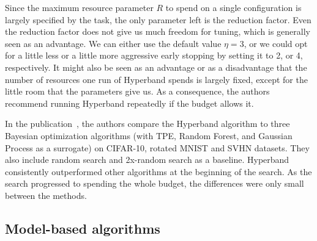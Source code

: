 Since the maximum resource parameter $R$ to spend on a single configuration is largely specified by the task, the only parameter left is the reduction factor. Even the reduction factor does not give us much freedom for tuning, which is generally seen as an advantage. We can either use the default value $\eta=3$, or we could opt for a little less or a little more aggressive early stopping by setting it to 2, or 4, respectively. It might also be seen as an advantage or as a disadvantage that the number of resources one run of Hyperband spends is largely fixed, except for the little room that the parameters give us. As a consequence, the authors recommend running Hyperband repeatedly if the budget allows it.

In the publication~\cite{li2018hyperband}, the authors compare the Hyperband algorithm to three Bayesian optimization algorithms (with TPE, Random Forest, and Gaussian Process as a surrogate) on CIFAR-10, rotated MNIST and SVHN datasets. They also include random search and 2x-random search as a baseline. Hyperband consistently outperformed other algorithms at the beginning of the search. As the search progressed to spending the whole budget, the differences were only small between the methods.

\subsection{Model-based algorithms}
